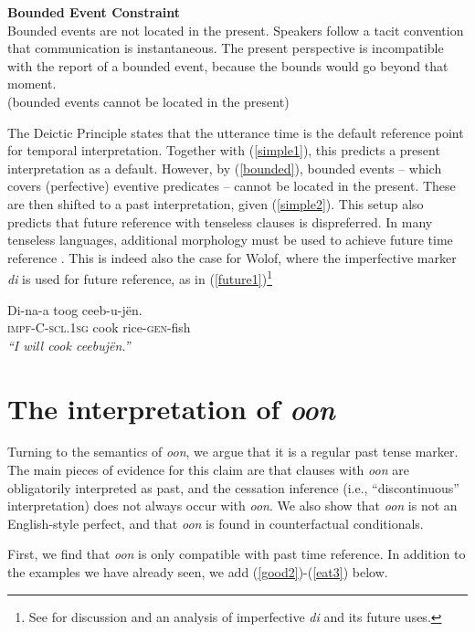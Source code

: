 \documentclass[output=paper
,modfonts
,nonflat]{langsci/langscibook}
\begin{document}
\ea\label{bounded} \textbf{Bounded Event Constraint} \\ Bounded events are not located in the present. Speakers follow a tacit convention that communication is instantaneous. The present perspective is incompatible with the report of a bounded event, because the bounds would go beyond that moment. \\
(bounded events cannot be located in the present)
\z

The Deictic Principle states that the utterance time is the default reference point for temporal interpretation. Together with (\ref{simple1}), this predicts a present interpretation as a default. However, by (\ref{bounded}), bounded events -- which covers (perfective) eventive predicates -- cannot be located in the present. These are then shifted to a past interpretation, given (\ref{simple2}). This setup also predicts that future reference with tenseless clauses is dispreferred. In many tenseless languages, additional morphology must be used to achieve future time reference \citep{matthewson06temporal, tonhauser11temporal, bochnak16past}. This is indeed also the case for Wolof, where the imperfective marker \textit{di} is used for future reference, as in (\ref{future1})\footnote{See \citealt{bochnak17deriving} for discussion and an analysis of imperfective \textit{di} and its future uses.}

\ea
\gll Di-na-a toog ceeb-u-j\"en.\\
\textsc{impf}-C-\textsc{scl.1sg}  cook rice-\textsc{gen}-fish\\
\glt \textit{``I will cook ceebuj\"en.''}\label{future1}
\z


\section{The interpretation of \textit{oon}}

Turning to the semantics of \textit{oon}, we argue that it is a
regular past tense marker. The main pieces of evidence for this claim are that clauses with \textit{oon} are obligatorily interpreted as
past, and the cessation inference (i.e., ``discontinuous'' interpretation) does not always occur with \textit{oon}. We also show that
\textit{oon} is not an English-style perfect, and that \textit{oon} is
found in counterfactual conditionals.

First, we find that \textit{oon} is only compatible with past time reference. In addition to the examples we have already seen, we add (\ref{good2})-(\ref{eat3}) below.
\end{document}
